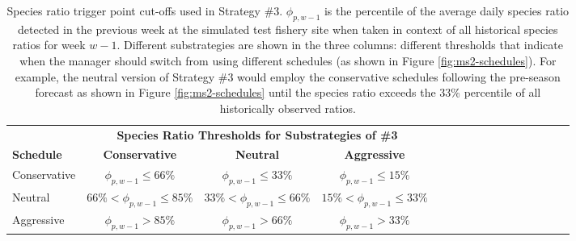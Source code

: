 \documentclass[12pt,]{book}
\theoremstyle{definition}
\theoremstyle{definition}
\theoremstyle{definition}
\theoremstyle{remark}
\begin{document}
\clearpage

\begin{singlespace}

\begin{table}

\caption{\label{tab:ms3-ratio-table}Species ratio trigger point cut-offs used in Strategy \#3. $\phi_{p, w-1}$ is the percentile of the average daily species ratio detected in the previous week at the simulated test fishery site when taken in context of all historical species ratios for week $w-1$. Different substrategies are shown in the three columns: different thresholds that indicate when the manager should switch from using different schedules (as shown in Figure \ref{fig:ms2-schedules}). For example, the neutral version of Strategy \#3 would employ the conservative schedules following the pre-season forecast as shown in Figure \ref{fig:ms2-schedules} until the species ratio exceeds the 33\% percentile of all historically observed ratios.}
\centering
\begin{tabular}[t]{lccclccclccclccc}
\toprule
\multicolumn{1}{c}{\bfseries } & \multicolumn{3}{c}{\bfseries Species Ratio Thresholds for Substrategies of \#3} \\
\cmidrule(l{2pt}r{2pt}){2-4}
\textbf{Schedule} & \textbf{Conservative} & \textbf{Neutral} & \textbf{Aggressive}\\
\midrule
Conservative & $\phi_{p, w-1} \le 66\%$ & $\phi_{p, w-1} \le 33\%$ & $\phi_{p, w-1} \le 15\%$\\
Neutral & $66 \% < \phi_{p, w-1} \le 85\%$ & $33 \% < \phi_{p, w-1} \le 66\%$ & $15 \% < \phi_{p, w-1} \le 33\%$\\
Aggressive & $\phi_{p, w-1} > 85\%$ & $\phi_{p, w-1} > 66\%$ & $\phi_{p, w-1} > 33\%$\\
\bottomrule
\end{tabular}
\end{table}

\clearpage

\begin{table}


\end{table}
\end{singlespace}
\end{document}
